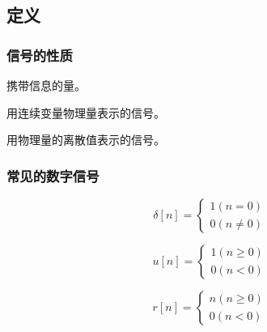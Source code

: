 \documentclass{ctexbeamer}
\begin{document}
	\subsection{定义}
	\begin{frame}
		\frametitle{信号的性质}
		\begin{definition}[信号]
			携带信息的量。
		\end{definition}
		\begin{definition}[模拟信号]
			用连续变量物理量表示的信号。
		\end{definition}
		\begin{definition}[数字信号]
			用物理量的离散值表示的信号。
		\end{definition}
	\end{frame}

	\begin{frame}[allowframebreaks]
		\frametitle{常见的数字信号}
		\begin{definition}[冲激信号]
			\begin{equation}
				\delta [n]=\begin{cases}
					1 (n=0)\\0 (n\neq 0)
				\end{cases}
			\end{equation}
		\end{definition}
		
		\begin{definition}[阶跃信号]
			\begin{equation}
				u[n]=\begin{cases}
					1 (n\geq0)\\0 (n< 0)
				\end{cases}
			\end{equation}
		\end{definition}
		\begin{definition}[斜坡信号]
			\begin{equation}
				r[n]=\begin{cases}
					n (n\geq0)\\0 (n< 0)
				\end{cases}
			\end{equation}
		\end{definition}
		
	\end{frame}
\end{document}
